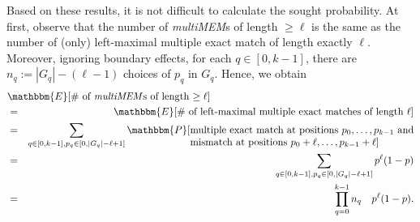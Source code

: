 \documentclass[12pt]{article}
\newcommand{\Size}[1]{|#1|}
\newcommand{\MMEM}[0]{\textit{multiMEM}\xspace}
\newcommand{\SingleCM}[0]{p}
\newcommand{\Expect}{\mathbbm{E}}
\newcommand{\PR}{\mathbbm{P}}
\begin{document}
Based on these results, it is not difficult to calculate the
sought probability. At first, observe that the number of \MMEM{s} of 
length $\geq \ell $ is the same as the number of (only) left-maximal 
multiple exact match of length exactly $\ell$. Moreover, ignoring
boundary effects, for each \(q\in[0,k-1]\), there are 
\(n_{q}:=\Size{G_{q}}-(\ell-1)\) choices of \(p_{q}\) in \(G_{q}\). 
Hence, we obtain
\begin{eqnarray}
\lefteqn{\Expect[\# \mbox{ of \MMEM{s} of length $\geq\ell$}]}\nonumber \\
& = &
\Expect[\# \mbox{ of left-maximal multiple exact matches of length $\ell$}]\nonumber \\
& = &
\sum_{q\in[0,k-1],p_{q}\in[0,\Size{G_{q}}-\ell+1]}
  \PR [
  {\setlength{\arraycolsep}{0em}
   \begin{array}[t]{l}
     \mbox{multiple exact match at positions }p_{0},\ldots,p_{k-1}\mbox{ and}\\
     \mbox{mismatch at positions }p_{0}+\ell,\ldots,p_{k-1}+\ell]
   \end{array}
  }\nonumber \\
& = &
\sum_{q\in[0,k-1],p_{q}\in[0,\Size{G_{q}}-\ell+1]}
 \SingleCM^{\ell}(1-\SingleCM)\nonumber\\
& = &
\prod_{q=0}^{k-1}n_{q}~~~ \SingleCM^{\ell} (1-\SingleCM).\label{MultiProb}
\end{eqnarray}
\end{document}
